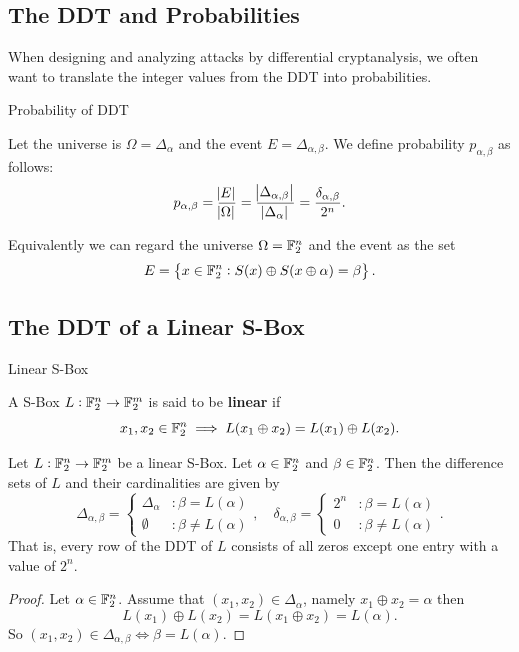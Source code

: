 \documentclass[11pt,openany]{article}
\begin{document}
\newpage
\subsection{The DDT and Probabilities}
When designing and analyzing attacks by differential cryptanalysis, we often want to translate the integer values from the DDT into probabilities.

\begin{defbox}{Probability of DDT}
\begin{definition}
	Let the universe is $\Omega=\Delta_\alpha$ and the event $E=\Delta_{\alpha,\beta}$. We define probability $p_{\alpha,\beta}$ as follows: \[
	p_{\alpha,\beta}=\frac{\abs{E}}{\abs{\Omega}}=\frac{\abs{\Delta_{\alpha,\beta}}}{\abs{\Delta_\alpha}}=\frac{\delta_{\alpha,\beta}}{2^n}.
	\]
\end{definition}
\end{defbox}
\begin{remark}
	Equivalently we can regard the universe $\Omega=\mathbb{F}_2^n$ and the event as the set \[
	E=\set{x\in\mathbb{F}_2^n:S(x)\oplus S(x\oplus\alpha)=\beta}.
	\]
\end{remark}

\subsection{The DDT of a Linear S-Box}
\begin{defbox}{Linear S-Box}
\begin{definition}
A S-Box $L:\mathbb{F}_2^n\to\mathbb{F}_2^m$ is said to be \textbf{linear} if \[
x_1,x_2\in\mathbb{F}_2^n\implies L(x_1\oplus x_2)=L(x_1)\oplus L(x_2).
\]
\end{definition}
\end{defbox}
\vspace{12pt}
\begin{probox}{}
\begin{proposition}
Let $L:\mathbb{F}_2^n\to\mathbb{F}_2^m$ be a linear S-Box. Let $\alpha\in\mathbb{F}_2^n$ and $\beta\in\mathbb{F}_2^n$. Then the difference sets of $L$ and their cardinalities are given by \[
\Delta_{\alpha,\beta}=\begin{cases}
\Delta_\alpha &:\beta=L(\alpha)\\
\emptyset &:\beta\neq L(\alpha)
\end{cases},\quad \delta_{\alpha,\beta}=\begin{cases}
2^n &:\beta=L(\alpha)\\
0 &:\beta\neq L(\alpha)
\end{cases}.
\] That is, every row of the DDT of $L$ consists of all zeros except one entry with a value of $2^n$.
\end{proposition}
\end{probox}
\begin{proof}
	Let $\alpha\in\mathbb{F}_2^n$. Assume that $(x_1,x_2)\in\Delta_{\alpha}$, namely $x_1\oplus x_2=\alpha$ then \[
	L(x_1)\oplus L(x_2)=L(x_1\oplus x_2)=L(\alpha).
	\] So $(x_1,x_2)\in\Delta_{\alpha,\beta}\iff\beta=L(\alpha)$.
\end{proof}
\end{document}
